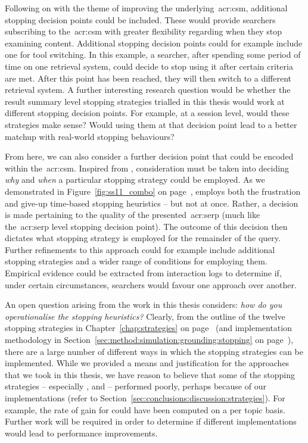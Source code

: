Following on with the theme of improving the underlying~\gls{acr:csm}, additional stopping decision points could be included. These would provide searchers subscribing to the~\gls{acr:csm} with greater flexibility regarding when they stop examining content. Additional stopping decision points could for example include one for tool switching. In this example, a searcher, after spending some period of time on one retrieval system, could decide to stop using it after certain criteria are met. After this point has been reached, they will then switch to a different retrieval system. A further interesting research question would be whether the result summary level stopping strategies trialled in this thesis would work at different stopping decision points. For example, at a session level, would these strategies make sense? Would using them at that decision point lead to a better matchup with real-world stopping behaviours?

From here, we can also consider a further decision point that could be encoded within the~\gls{acr:csm}. Inspired from , consideration must be taken into deciding \emph{why} and \emph{when} a particular stopping strategy could be employed. As we demonstrated in Figure~\ref{fig:ss11_combo} on page~\pageref{fig:ss11_combo},  employs both the frustration and give-up time-based stopping heuristics -- but not at once. Rather, a decision is made pertaining to the quality of the presented~\gls{acr:serp} (much like the~\gls{acr:serp} level stopping decision point). The outcome of this decision then dictates what stopping strategy is employed for the remainder of the query. Further refinements to this approach could for example include additional stopping strategies and a wider range of conditions for employing them. Empirical evidence could be extracted from interaction logs to determine if, under certain circumstances, searchers would favour one approach over another.

An open question arising from the work in this thesis considers: \emph{how do you operationalise the stopping heuristics?} Clearly, from the outline of the twelve stopping strategies in Chapter~\ref{chap:strategies} on page~\pageref{chap:strategies} (and implementation methodology in Section~\ref{sec:method:simulation:grounding:stopping} on page~\pageref{sec:method:simulation:grounding:stopping}), there are a large number of different ways in which the stopping strategies can be implemented. While we provided a means and justification for the approaches that we took in this thesis, we have reason to believe that some of the stopping strategies -- especially ,  and  -- performed poorly, perhaps because of our implementations (refer to Section~\ref{sec:conclusions:discussion:strategies}). For example, the rate of gain for  could have been computed on a per topic basis. Further work will be required in order to determine if different implementations would lead to performance improvements.

